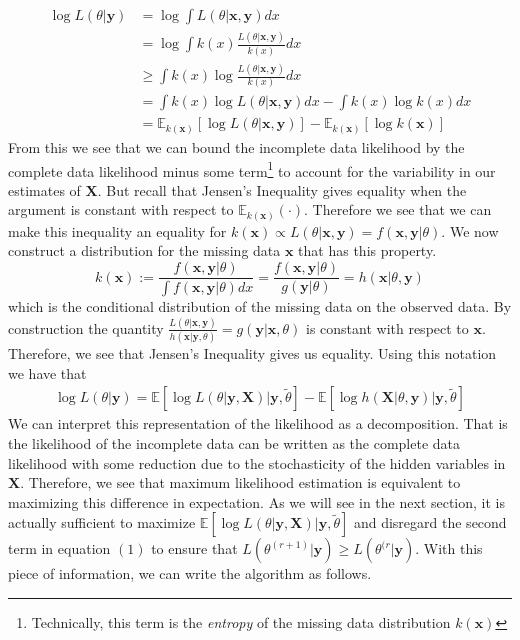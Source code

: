 \documentclass{article}
\newcommand{\E}{{\mathbb{E}}}
\begin{document}
\begin{align*}
\log L(\theta|\mathbf{y}) &= \log \int L(\theta|\mathbf{x},\mathbf{y})dx\\
&= \log \int k(x)\frac{L(\theta|\mathbf{x},\mathbf{y})}{k(x)}dx\\
&\geq \int k(x)\log\frac{L(\theta|\mathbf{x},\mathbf{y})}{k(x)}dx\\
&= \int k(x)\log L(\theta|\mathbf{x},\mathbf{y})dx - \int k(x)\log k(x)dx\\
&= \E_{k(\mathbf{x})}[\log L(\theta|\mathbf{x},\mathbf{y})]- \E_{k(\mathbf{x})}[\log k(\mathbf{x})]
\end{align*}
From this we see that we can bound the incomplete data likelihood by the complete data likelihood minus some term\footnote{Technically, this term is the \textit{entropy} of the missing data distribution $k(\mathbf{x})$} to account for the variability in our estimates of $\mathbf{X}$. But recall that Jensen's Inequality gives equality when the argument is constant with respect to $\E_{k(\mathbf{x})}(\cdot)$. Therefore we see that we can make this inequality an equality for $k(\mathbf{x})\propto L(\theta|\mathbf{x}, \mathbf{y}) = f(\mathbf{x},\mathbf{y}|\theta)$. We now construct a distribution for the missing data $\mathbf{x}$ that has this property.
$$k(\mathbf{x}):= \frac{f(\mathbf{x},\mathbf{y}|\theta)}{\int f(\mathbf{x},\mathbf{y}|\theta)dx} = \frac{f(\mathbf{x},\mathbf{y}|\theta)}{g(\mathbf{y}|\theta)} = h(\mathbf{x}|\theta, \mathbf{y})$$ 
which is the conditional distribution of the missing data on the observed data. By construction the quantity $\frac{L(\theta|\mathbf{x},\mathbf{y})}{h(\mathbf{x}|\mathbf{y},\theta)} = g(\mathbf{y}|\mathbf{x},\theta)$ is constant with respect to $\mathbf{x}$. Therefore, we see that Jensen's Inequality gives us equality. Using this notation we have that 
\begin{align}
\log L(\theta|\mathbf{y}) = \E\left[\log L(\theta|\mathbf{y},\mathbf{X})\big|\mathbf{y},\tilde{\theta}\right] - \E\left[\log h(\mathbf{X}|\theta,\mathbf{y})\big| \mathbf{y},\tilde{\theta}\right]
\end{align}
We can interpret this representation of the likelihood as a decomposition. That is the likelihood of the incomplete data can be written as the complete data likelihood with some reduction due to the stochasticity of the hidden variables in $\mathbf{X}$. Therefore, we see that maximum likelihood estimation is equivalent to maximizing this difference in expectation. As we will see in the next section, it is actually sufficient to maximize $\E\left[\log L(\theta|\mathbf{y},\mathbf{X})\big|\mathbf{y},\tilde{\theta}\right]$ and disregard the second term in equation $(1)$ to ensure that $L(\theta^{(r+1)}|\mathbf{y})\geq L(\theta^{(r}|\mathbf{y})$. With this piece of information, we can write the algorithm as follows.
\end{document}
